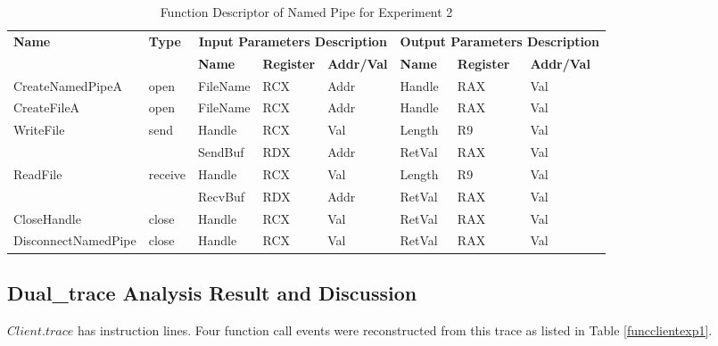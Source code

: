 \begin{table}[H]
  \centering
  \caption{Function Descriptor of Named Pipe for Experiment 2}
  \label{fdescexp1}
  \begin{tabular}{|l|l|l|l|l|l|l|l|}
\hline
             \multirow{2}{*}{{\textbf{Name}}} & \multirow{2}{*}{{\textbf{Type}}} & \multicolumn{3}{c|}{\textbf{Input Parameters Description}} & \multicolumn{3}{c|}{\textbf{Output Parameters Description}} \\
              \cline{3-8} 
             & & \textbf{Name}& \textbf{Register} & \textbf{Addr/Val} & \textbf{Name}& \textbf{Register} &  \textbf{Addr/Val}  \\
             \hline
      CreateNamedPipeA
       &open & FileName & RCX  & Addr &  Handle & RAX & Val\\
      \hline         
      CreateFileA
       &open & FileName & RCX & Addr&  Handle & RAX & Val\\ 
      \hline              
      \multirow{2}{*}{WriteFile}
       &\multirow{2}{*}{send} &  Handle & RCX & Val & Length& R9 &Val\\
        \cline{3-8} 
       & & SendBuf & RDX & Addr & RetVal& RAX & Val\\
      \hline            
      \multirow{2}{*}{ReadFile}
       &\multirow{2}{*}{receive} &  Handle & RCX & Val& Length &R9 & Val\\
        \cline{3-8} 
       & & RecvBuf & RDX  & Addr & RetVal& RAX & Val\\
      \hline            
      CloseHandle &
       close &  Handle & RCX & Val & RetVal& RAX & Val\\
      \hline            
      DisconnectNamedPipe &
      close &  Handle & RCX & Val & RetVal& RAX & Val\\
      \hline               
  \end{tabular}
\end{table}



\subsection{Dual\_trace Analysis Result and Discussion}
$Client.trace$ has instruction lines. Four function call events were reconstructed from this trace as listed in Table \ref{funcclientexp1}.

